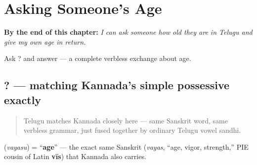 
\chapter{Asking Someone's Age}
\label{ch:te-asking-age}

\begin{chapteropening}
\textbf{By the end of this chapter:} \emph{I can ask someone how old they are in Telugu and give my own age in return.}

Ask  ? and answer    — a complete verbless exchange about age.
\end{chapteropening}

\section[\texorpdfstring{\te{నీ} \te{వయసెంత}? (nī vayasenta)}{నీ వయసెంత? (nī vayasenta)}]{ ? — matching Kannada's simple possessive exactly}

\label{lesson:TE-C19-vayasu}



\begin{quote}
Telugu matches Kannada closely here — same Sanskrit word, same verbless grammar, just fused together by ordinary Telugu vowel sandhi.
\end{quote}

\begin{cousinweb}
\textbf{} (\emph{vayasu}) = \textquotedblleft{}\textbf{age}\textquotedblright{} — the exact same Sanskrit \textbf{} (\emph{vayas}, \textquotedblleft{}age, vigor, strength,\textquotedblright{} PIE cousin of Latin \textbf{vīs}) that Kannada also carries.
\end{cousinweb}


